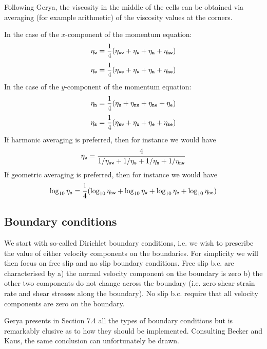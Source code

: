 Following Gerya, the viscosity in the middle of the cells
can be obtained via averaging (for example arithmetic) of the viscosity values at the corners.

In the case of the $x$-component of the momentum equation:
\[
\eta_{\tt w} = \frac{1}{4}(\eta_{\tt sw}+\eta_{\tt s}+\eta_{\tt n} + \eta_{\tt nw})
\]
\[
\eta_{\tt e} = \frac{1}{4}(\eta_{\tt se}+\eta_{\tt s}+\eta_{\tt n} + \eta_{\tt ne})
\]
In the case of the $y$-component of the momentum equation:
\[
\eta_{\tt n} = \frac{1}{4}(\eta_{\tt w}+\eta_{\tt nw}+\eta_{\tt ne} + \eta_{\tt e})
\]
\[
\eta_{\tt s} = \frac{1}{4}(\eta_{\tt sw}+\eta_{\tt w}+\eta_{\tt e} + \eta_{\tt se})
\]
If harmonic averaging is preferred, then for instance we would have
\[
\eta_{\tt w} = \frac{4}{1/\eta_{\tt sw}+1/\eta_{\tt s}+1/\eta_{\tt n} + 1/\eta_{\tt nw} }
\]
If geometric averaging is preferred, then for instance we would have
\[
\log_{10} \eta_{\tt s} = \frac{1}{4}(\log_{10} \eta_{\tt sw}
+\log_{10}\eta_{\tt w}+\log_{10}\eta_{\tt e} + \log_{10} \eta_{\tt se})
\]



\subsection{Boundary conditions \label{ss:fdmstokesbc}}

We start with so-called Dirichlet boundary conditions, i.e. we wish 
to prescribe the value of either velocity components on the boundaries.
For simplicity we will then focus on free slip and no slip boundary conditions.
Free slip b.c. are characterised by a) the normal velocity component on the boundary is zero 
b) the other two components do not change across the boundary (i.e.
zero shear strain rate and shear stresses along the boundary).
No slip b.c. require that all velocity components are zero on the boundary.

Gerya presents in Section 7.4 all the types of boundary conditions but is remarkably elusive 
as to how they should be implemented. Consulting Becker and Kaus, the same conclusion can 
unfortunately be drawn.

